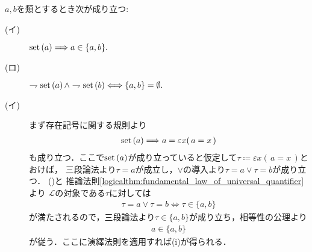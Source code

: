 	\begin{screen}
		\begin{thm}[真類の対は空]
		\label{thm:pair_of_proper_classes_is_emptyset}
			$a,b$を類とするとき次が成り立つ:
			\begin{description}
				\item[(イ)] $\operatorname*{set} \left(a\right) \Longrightarrow a \in \{a,b\}.$
				
				\item[(ロ)] $\rightharpoondown \operatorname*{set} \left(a\right) \wedge \rightharpoondown \operatorname*{set} \left(b\right) \Longleftrightarrow \{a,b\} = \emptyset.$
			\end{description}
		\end{thm}
	\end{screen}
	
	\begin{prf}\mbox{}
		\begin{description}
			\item[(イ)]
				まず存在記号に関する規則より
				\begin{align}
					\operatorname*{set} \left(a\right) \Longrightarrow a = \varepsilon x(\, a = x\, )
				\end{align}
				も成り立つ．ここで$\operatorname*{set} \left(a\right)$が成り立っていると仮定して$\tau \coloneqq \varepsilon x(\, a = x\, )$とおけば，
				三段論法より$\tau = a$が成立し，$\vee$の導入より$\tau = a \vee \tau = b$が成り立つ．
				()と
				推論法則\ref{logicalthm:fundamental_law_of_universal_quantifier}より
				$\mathcal{L}$の対象である$\tau$に対しては
				\begin{align}
					\tau = a \vee \tau = b \Longleftrightarrow \tau \in \{a,b\}
				\end{align}
				が満たされるので，三段論法より$\tau \in \{a,b\}$が成り立ち，相等性の公理より
				\begin{align}
					a \in \{a,b\}
				\end{align}
				が従う．ここに演繹法則を適用すれば(i)が得られる．
			

\end{description}
\end{prf}
